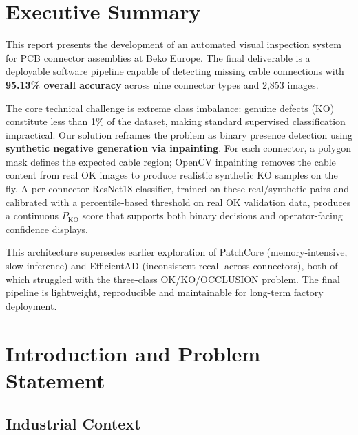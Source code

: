 \documentclass[11pt,a4paper,draft]{article}
\begin{document}
\newpage

\tableofcontents
\newpage


\section{Executive Summary}

This report presents the development of an automated visual inspection system for PCB connector assemblies at Beko Europe. The final deliverable is a deployable software pipeline capable of detecting missing cable connections with \textbf{95.13\% overall accuracy} across nine connector types and 2{,}853 images.

The core technical challenge is extreme class imbalance: genuine defects (KO) constitute less than 1\% of the dataset, making standard supervised classification impractical. Our solution reframes the problem as binary presence detection using \textbf{synthetic negative generation via inpainting}. For each connector, a polygon mask defines the expected cable region; OpenCV inpainting removes the cable content from real OK images to produce realistic synthetic KO samples on the fly. A per-connector ResNet18 classifier, trained on these real/synthetic pairs and calibrated with a percentile-based threshold on real OK validation data, produces a continuous $P_{\mathrm{KO}}$ score that supports both binary decisions and operator-facing confidence displays.

This architecture supersedes earlier exploration of PatchCore (memory-intensive, slow inference) and EfficientAD (inconsistent recall across connectors), both of which struggled with the three-class OK/KO/OCCLUSION problem. The final pipeline is lightweight, reproducible and maintainable for long-term factory deployment.

\section{Introduction and Problem Statement}

\subsection{Industrial Context}
\end{document}
